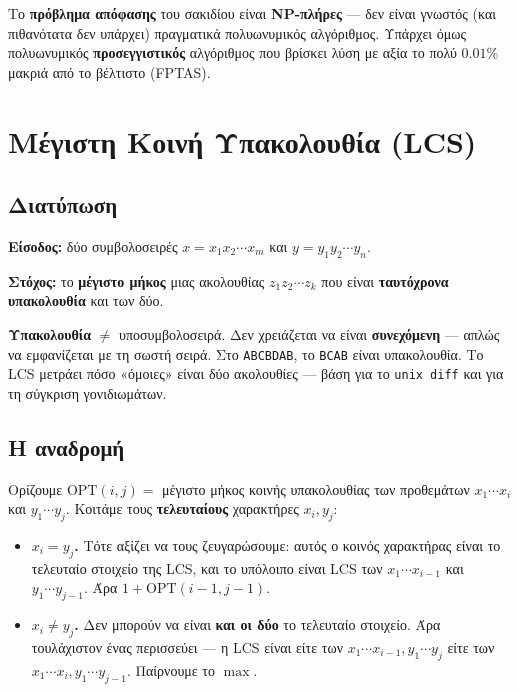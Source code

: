 \documentclass[11pt,a4paper]{article}
\begin{document}
\begin{keypoint}
Το \textbf{πρόβλημα απόφασης} του σακιδίου είναι \textbf{NP-πλήρες} --- δεν είναι
γνωστός (και πιθανότατα δεν υπάρχει) πραγματικά πολυωνυμικός αλγόριθμος. Υπάρχει
όμως πολυωνυμικός \textbf{προσεγγιστικός} αλγόριθμος που βρίσκει λύση με αξία το
πολύ $0.01\%$ μακριά από το βέλτιστο (FPTAS).
\end{keypoint}

\section{Μέγιστη Κοινή Υπακολουθία (LCS)}

\subsection{Διατύπωση}

\textbf{Είσοδος:} δύο συμβολοσειρές $x = x_1 x_2 \cdots x_m$ και
$y = y_1 y_2 \cdots y_n$.

\textbf{Στόχος:} το \textbf{μέγιστο μήκος} μιας ακολουθίας
$z_1 z_2 \cdots z_k$ που είναι \textbf{ταυτόχρονα υπακολουθία} και των δύο.

\begin{intuition}
\textbf{Υπακολουθία} $\ne$ υποσυμβολοσειρά. Δεν χρειάζεται να είναι
\textbf{συνεχόμενη} --- απλώς να εμφανίζεται με τη σωστή σειρά. Στο
\texttt{ABCBDAB}, το \texttt{BCAB} είναι υπακολουθία. Το LCS μετράει πόσο
«όμοιες» είναι δύο ακολουθίες --- βάση για το \texttt{unix diff} και για τη
σύγκριση γονιδιωμάτων.
\end{intuition}

\subsection{Η αναδρομή}

Ορίζουμε $\text{OPT}(i, j) = $ μέγιστο μήκος κοινής υπακολουθίας των προθεμάτων
$x_1 \cdots x_i$ και $y_1 \cdots y_j$. Κοιτάμε τους \textbf{τελευταίους}
χαρακτήρες $x_i, y_j$:
\begin{itemize}
  \item \textbf{$x_i = y_j$.} Τότε αξίζει να τους ζευγαρώσουμε: αυτός ο κοινός
  χαρακτήρας είναι το τελευταίο στοιχείο της LCS, και το υπόλοιπο είναι LCS των
  $x_1 \cdots x_{i-1}$ και $y_1 \cdots y_{j-1}$. Άρα $1 + \text{OPT}(i-1, j-1)$.
  \item \textbf{$x_i \ne y_j$.} Δεν μπορούν να είναι \textbf{και οι δύο} το
  τελευταίο στοιχείο. Άρα τουλάχιστον ένας περισσεύει --- η LCS είναι είτε των
  $x_1 \cdots x_{i-1}, y_1 \cdots y_j$ είτε των $x_1 \cdots x_i, y_1 \cdots
  y_{j-1}$. Παίρνουμε το $\max$.
\end{itemize}
\end{document}
